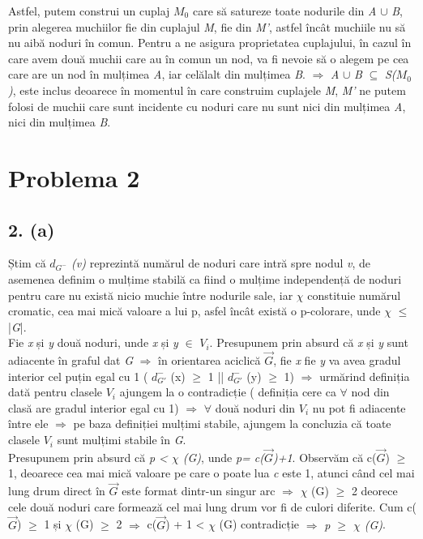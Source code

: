 \documentclass[12pt] {fphw}
\begin{document}
Astfel, putem construi un cuplaj $M_{0}$ care să satureze toate nodurile din \textit{A} $\cup$ \textit{B}, prin alegerea muchiilor fie din cuplajul \textit{M}, fie din \textit{M'}, astfel încât muchiile nu să nu aibă noduri în comun. Pentru a ne asigura proprietatea cuplajului, în cazul în care avem două muchii care au în comun un nod, va fi nevoie să o alegem pe cea care are un nod în mulțimea  \textit{A}, iar celălalt din mulțimea \textit{B}. $\Rightarrow$  
 \textit{A} $\cup$ \textit{B} $\subseteq$ \textit{S($M_{0}$)}, este inclus deoarece în momentul în care construim cuplajele  \textit{M}, \textit{M'} ne putem folosi de muchii care sunt incidente cu noduri care nu sunt nici din mulțimea \textit{A}, nici din mulțimea \textit{B}. 

\section*{Problema 2}
\subsection*{2. (a)} 
   Știm că  \textit{$d_{G^{-}}$ (v)} reprezintă numărul de noduri care intră spre nodul \textit{v}, de asemenea definim o mulțime stabilă ca fiind o mulțime independență de noduri pentru care nu există nicio muchie între nodurile sale, iar $\chi$ constituie numărul cromatic, cea mai mică valoare a lui p, asfel încât există o p-colorare, unde  $\chi$ $\leq$ |\textit{G}|. \\

     Fie \textit{x} și \textit{y}  două noduri, unde \textit{x} și \textit{y} $\in$ \textit{$V_{i}$}. Presupunem prin absurd că \textit{x} și \textit{y}  sunt adiacente în graful dat \textit{G}  $\Rightarrow$ în orientarea aciclică {$\vec{G}$}, fie \textit{x} fie \textit{y} va avea gradul interior cel puțin egal cu 1 ( {$d_{G'}^-$} (x) $\geq$ 1 || {$d_{G'}^-$} (y) $\geq$ 1)  $\Rightarrow$   urmărind definiția dată pentru clasele  $V_{i}$ ajungem la o contradicție ( definiția cere ca $\forall$ nod din clasă are gradul interior egal cu 1) $\Rightarrow$ $\forall$ două noduri din $V_{i}$ nu pot fi adiacente între ele $\Rightarrow$ pe baza definiției mulțimi stabile, ajungem la concluzia că toate clasele $V_{i}$ sunt mulțimi stabile în \textit{G}. \\

     Presupunem prin absurd că \textit{p < $\chi$ (G)}, unde \textit{p= c({$\vec{G}$})+1}. Observăm că c({$\vec{G}$}) $\geq$ 1, deoarece cea mai mică valoare pe care o poate lua \textit{c} este 1, atunci când cel mai lung drum direct în {$\vec{G}$} este format dintr-un singur arc $\Rightarrow$  $\chi$ (G) $\geq$ 2 deorece cele două noduri care formează cel mai lung drum vor fi de culori diferite. Cum c({$\vec{G}$}) $\geq$ 1 și $\chi$ (G) $\geq$ 2 
 $\Rightarrow$ c({$\vec{G}$}) + 1 < $\chi$ (G) contradicție $\Rightarrow$  \textit{p $\geq$ $\chi$ (G)}. 
 
\end{document}
